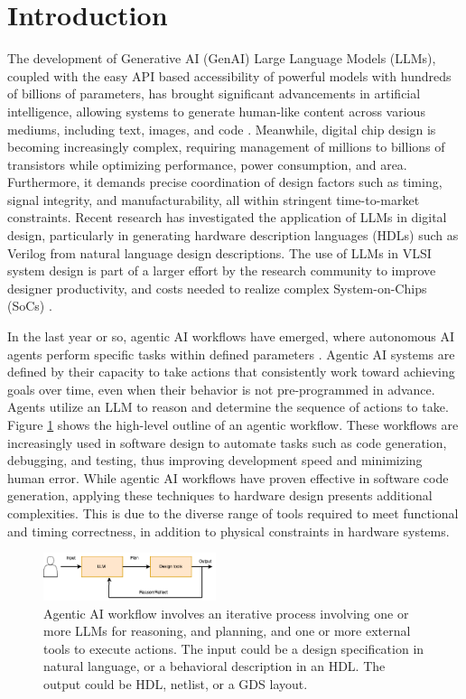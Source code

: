 \section{Introduction}
\label{sec:introduction}

The development of Generative AI (GenAI) Large Language Models (LLMs), coupled with the easy API based accessibility of powerful models with hundreds of billions of parameters,  has brought significant advancements in artificial intelligence, allowing systems to generate human-like content across various mediums, including text, images, and code \cite{intro2LLM}. Meanwhile, digital chip design is becoming increasingly complex, requiring management of millions to billions of transistors while optimizing performance, power consumption, and area. Furthermore, it demands precise coordination of design factors such as timing, signal integrity, and manufacturability, all within stringent time-to-market constraints. Recent research has investigated the application of LLMs in digital design, particularly in generating hardware description languages (HDLs) such as Verilog from natural language design descriptions. The use of LLMs in VLSI system design is part of a larger effort by the research community to improve designer productivity, and costs needed to realize complex System-on-Chips (SoCs) \cite{ajayi2019openroad}.

In the last year or so, agentic AI workflows have emerged, where autonomous AI agents perform specific tasks within defined parameters \cite{promptengineering2024}. Agentic AI systems are defined by their capacity to take actions that consistently work toward achieving goals over time, even when their behavior is not pre-programmed in advance. Agents utilize an LLM to reason and determine the sequence of actions to take. Figure \ref{fig:agentic_overview} shows the high-level outline of an agentic workflow.  These workflows are increasingly used in software design to automate tasks such as code generation, debugging, and testing, thus improving development speed and minimizing human error. While agentic AI workflows have proven effective in software code generation, applying these techniques to hardware design presents additional complexities. This is due to the diverse range of tools required to meet functional and timing correctness, in addition to physical constraints in hardware systems.


\begin{figure}[htbp]
	\includegraphics[width=0.45\textwidth]{figs/agentic_overview.png}
	\caption{Agentic AI workflow involves an iterative process involving one or more LLMs for reasoning, and planning, and one or more external tools to execute actions. The input could be a design specification in natural language, or a behavioral description in an HDL. The output could be HDL, netlist, or a GDS layout.
}
	\label{fig:agentic_overview}
\end{figure}

